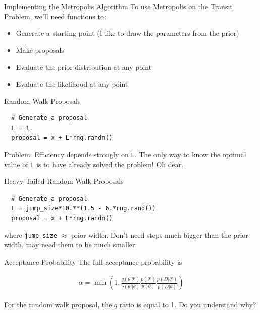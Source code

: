 \begin{frame}[t]{Implementing the Metropolis Algorithm}
To use Metropolis on the Transit Problem, we'll need functions to:
\begin{itemize}
\item Generate a starting point (I like to draw the parameters from the prior)
\item Make proposals
\item Evaluate the prior distribution at any point
\item Evaluate the likelihood at any point
\end{itemize}
\end{frame}


\begin{frame}[t, fragile]{Random Walk Proposals}
\begin{verbatim}
  # Generate a proposal
  L = 1.
  proposal = x + L*rng.randn()
\end{verbatim}

Problem: Efficiency depends strongly on {\tt L}. The only way to know the
optimal value of {\tt L} is to have already solved the problem! Oh dear.
\end{frame}

\begin{frame}[t, fragile]{Heavy-Tailed Random Walk Proposals}
\begin{verbatim}
  # Generate a proposal
  L = jump_size*10.**(1.5 - 6.*rng.rand())
  proposal = x + L*rng.randn()
\end{verbatim}
where {\tt jump\_size} $\approx$ prior width.
Don't need steps much bigger than the prior width, may need them to be much
smaller.
\end{frame}


\begin{frame}[t]{Acceptance Probability}
The full acceptance probability is

\begin{eqnarray}
\alpha =
\min\left(1, \frac{q(\theta|\theta')}{q(\theta'|\theta)}\frac{p(\theta')}{p(\theta)}\frac{p(D|\theta')}{p(D|\theta)}\right)
\end{eqnarray}

For the random walk proposal, the $q$ ratio is equal to 1. Do you understand
why?
\end{frame}

